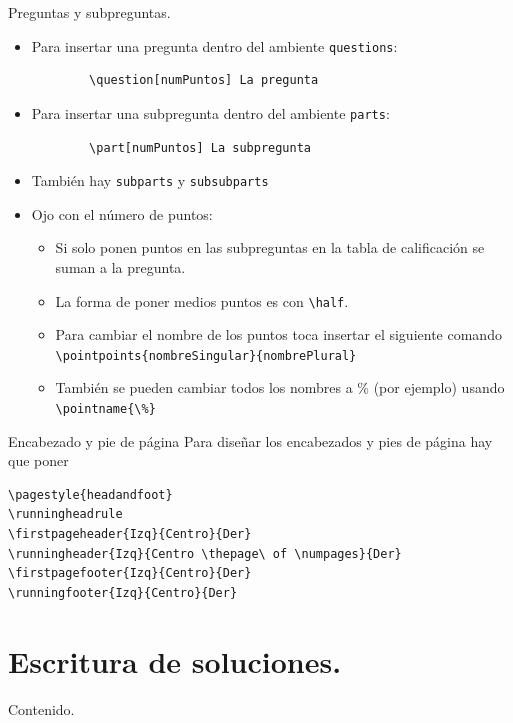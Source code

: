 \documentclass[dvipsnames,xcolor=x11names, handout]{beamer}
\theoremstyle{plain}
\theoremstyle{definition}
\begin{document}
\begin{frame}[fragile]{Preguntas y subpreguntas.}
\begin{itemize}[<+->]
    \item Para insertar una pregunta dentro del ambiente \verb!questions!:
    \begin{verbatim}
        \question[numPuntos] La pregunta
    \end{verbatim}
    \item Para insertar una subpregunta dentro del ambiente \verb!parts!:
    \begin{verbatim}
        \part[numPuntos] La subpregunta
    \end{verbatim}
    \item También hay \verb!subparts! y  \verb!subsubparts! 
    \item Ojo con el número de puntos:
    \begin{itemize}[<+->]
        \item Si solo ponen puntos en las subpreguntas en la tabla de calificación se suman a la pregunta.
        \item La forma de poner medios puntos es con \verb!\half!.
        \item Para cambiar el nombre de los puntos toca insertar el siguiente comando
        \verb!\pointpoints{nombreSingular}{nombrePlural}!
        \item También se pueden cambiar todos los nombres a \% (por ejemplo) usando \verb!\pointname{\%}! 
    \end{itemize}
\end{itemize}
\end{frame}

\begin{frame}[fragile]{Encabezado y pie de página}
Para diseñar los encabezados y pies de página hay que poner 
\begin{verbatim}
\pagestyle{headandfoot}
\runningheadrule
\firstpageheader{Izq}{Centro}{Der}
\runningheader{Izq}{Centro \thepage\ of \numpages}{Der}
\firstpagefooter{Izq}{Centro}{Der}
\runningfooter{Izq}{Centro}{Der}
\end{verbatim}
\end{frame}

\section{Escritura de soluciones.}
\begin{frame}{Contenido.}
  \tableofcontents[currentsection]
\end{frame}
\end{document}
